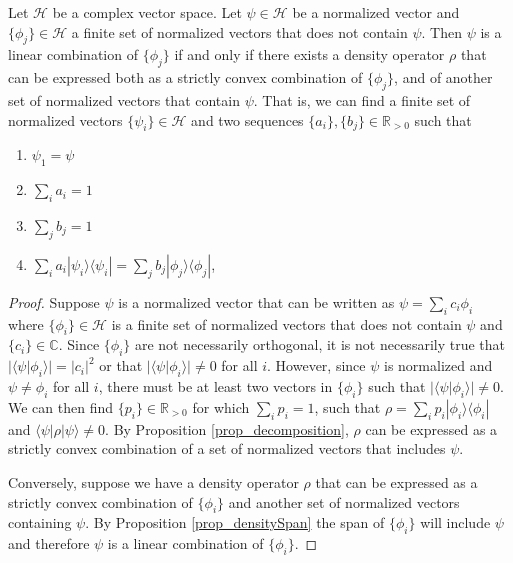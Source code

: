 \documentclass[10pt,twocolumn, nofootinbib]{revtex4-2}
\def\>{\rangle}
\def\<{\langle}
\begin{document}
\begin{prop}\label{prop_superpositionIsDecomposition}
Let $\mathcal{H}$ be a complex vector space. Let $\psi \in \mathcal{H}$ be a normalized vector and $\{\phi_j\} \in \mathcal{H}$ a finite set of normalized vectors that does not contain $\psi$. Then $\psi$ is a linear combination of $\{\phi_j\}$ if and only if there exists a density operator $\rho$ that can be expressed both as a strictly convex combination of $\{\phi_j\}$, and of another set of normalized vectors that contain $\psi$. That is, we can find a finite set of normalized vectors $\{\psi_i\} \in \mathcal{H}$ and two sequences $\{a_i\}, \{b_j\} \in \mathbb{R}_{>0}$ such that
\begin{enumerate}
\item $\psi_1 = \psi$
\item $\sum_i a_i = 1$
\item $\sum_j b_j = 1$
\item $\sum_i a_i |\psi_i\>\<\psi_i| = \sum_j b_j |\phi_j\>\<\phi_j|$,
\end{enumerate}
\end{prop}

\begin{proof}
Suppose $\psi$ is a normalized vector that can be written as $\psi = \sum_{i} c_i \phi_i$ where $\{\phi_i\} \in \mathcal{H}$ is a finite set of normalized vectors that does not contain $\psi$ and $\{c_i\} \in \mathbb{C}$. Since $\{\phi_i\}$ are not necessarily orthogonal, it is not necessarily true that $|\<\psi|\phi_i\>| = |c_i|^2$ or that $|\<\psi|\phi_i\>| \neq 0$ for all $i$. However, since $\psi$ is normalized and $\psi \neq \phi_i$ for all $i$, there must be at least two vectors in $\{\phi_i\}$ such that $|\<\psi|\phi_i\>| \neq 0$. We can then find $\{p_i\} \in \mathbb{R}_{>0}$ for which $\sum_i p_i =1$, such that $\rho = \sum_i p_i |\phi_i\>\<\phi_i|$ and $\<\psi|\rho|\psi\> \neq 0$. By Proposition \ref{prop_decomposition}, $\rho$ can be expressed as a strictly convex combination of a set of normalized vectors that includes $\psi$.

Conversely, suppose we have a density operator $\rho$ that can be expressed as a strictly convex combination of $\{\phi_i\}$ and another set of normalized vectors containing $\psi$. By Proposition \ref{prop_densitySpan} the span of $\{\phi_i\}$ will include $\psi$ and therefore $\psi$ is a linear combination of $\{\phi_i\}$.
\end{proof}
\end{document}
